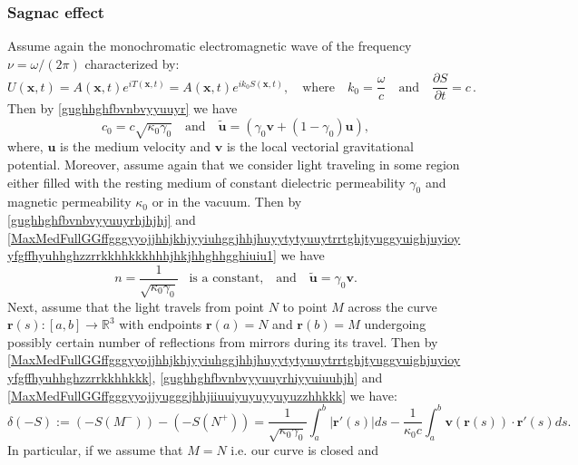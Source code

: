 \documentclass{article}
\theoremstyle{definition}
\theoremstyle{remark}
\renewcommand{\vec}[1]{\mathbf{#1}}
\newcommand{\er}{\eqref}
\newcommand{\er}{\eqref}
\begin{document}
\subsubsection{Sagnac effect}\label{seGO}
Assume again the monochromatic electromagnetic wave of the frequency
$\nu=\omega/(2\pi)$ characterized by:
\begin{equation}\label{MaxVacFullPPNmmmffffffiuiuhjuughbghhuiiujjhhjjhjhhjhjjhhjhjjh}
U(\vec x,t)=A(\vec x,t)e^{iT(\vec x,t)}=A(\vec x,t)e^{ik_0S(\vec
x,t)},\quad\text{where}\quad
k_0=\frac{\omega}{c}\quad\text{and}\quad\frac{\partial S}{\partial
t}=c\,.
\end{equation}
Then by \er{gughhghfbvnbvyyuuyr} we have
\begin{equation}\label{gughhghfbvnbvyyuuyrhjhjhj}
c_0=c\sqrt{\kappa_0\gamma_0}\quad\text{and}\quad\vec {\tilde
u}=\left(\gamma_0\vec v+(1-\gamma_0)\vec u\right),
\end{equation}
where, $\vec u$ is the medium velocity and $\vec v$ is the local
vectorial gravitational potential. Moreover, assume again that we
consider light traveling in some region either filled with the
resting medium of constant dielectric permeability $\gamma_0$ and
magnetic permeability $\kappa_0$ or in the vacuum. Then by
\er{gughhghfbvnbvyyuuyrhjhjhj} and
\er{MaxMedFullGGffgggyyojjhhjkhjyyiuhggjhhjhuyytytyuuytrrtghjtyuggyuighjuyioyyfgffhyuhhghzzrrkkhhkkkhhhjhkjhhghhgghiuiu1}
we have
\begin{equation}\label{gughhghfbvnbvyyuuyrhiyyuiuuhjh}
n=\frac{1}{\sqrt{\kappa_0\gamma_0}}\;\;\;\text{is a
constant,}\quad\text{and}\quad\vec {\tilde u}=\gamma_0\vec v.
\end{equation}
Next, assume that the light travels from point $N$ to point $M$
across the curve $\vec r(s):[a,b]\to\mathbb{R}^3$ with endpoints
$\vec r(a)=N$ and $\vec r(b)=M$ undergoing possibly certain number
of reflections from mirrors during its travel. Then by
\er{MaxMedFullGGffgggyyojjhhjkhjyyiuhggjhhjhuyytytyuuytrrtghjtyuggyuighjuyioyyfgffhyuhhghzzrrkkhhkkk},
\er{gughhghfbvnbvyyuuyrhiyyuiuuhjh} and
\er{MaxMedFullGGffgggyyojjyugggjhhjiiuuiyuyuyyuyuzzhhkkk} we have:
\begin{equation}\label{MaxMedFullGGffgggyyojjhhjkhjyyiuhggjhhjhuyytytyuuytrrtghjtyuggyuighjuyioyyfgffhyuhhghzzrrkkhhkkkhjjh}
\delta(-S):=\left(-S(M^-)\right)-
\left(-S(N^+)\right)=\frac{1}{\sqrt{\kappa_0\gamma_0}}\int_a^b
\left|\vec r'(s)\right|ds-\frac{1}{\kappa_0 c}\int_a^b\vec
v\left(\vec r(s)\right)\cdot\vec r'(s)ds.
\end{equation}
In particular, if we assume that $M=N$ i.e. our curve is closed and
\end{document}
